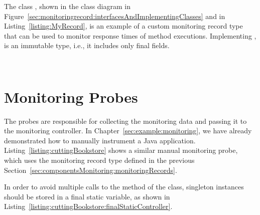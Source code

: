 \noindent The class , shown in the class diagram in %
Figure~\ref{sec:monitoringrecord:interfacesAndImplementingClasses} and in %
Listing~\ref{listing:MyRecord}, is an example of a custom monitoring record type %
that can be used to monitor response times of method executions. %
Implementing ,  is %
an immutable type, i.e., it includes only final fields. %

\enlargethispage{1cm}


\ %

\setJavaCodeListing



\section{Monitoring Probes}\label{sec:monitoring:probe}

The probes are responsible for collecting the monitoring data and passing it %
to the monitoring controller. %
In Chapter~\ref{sec:example:monitoring}, we have already demonstrated how to %
manually instrument a Java application. Listing~\ref{listing:cuttingBookstore} %
shows a similar manual monitoring probe, which uses the monitoring record type %
 defined in the previous Section~\ref{sec:componentsMonitoring:monitoringRecords}.



\noindent In order to avoid multiple calls to the  method of the %
 class, singleton instances should be stored %
in a final static variable, as shown in Listing~\ref{listing:cuttingBookstore:finalStaticController}.

